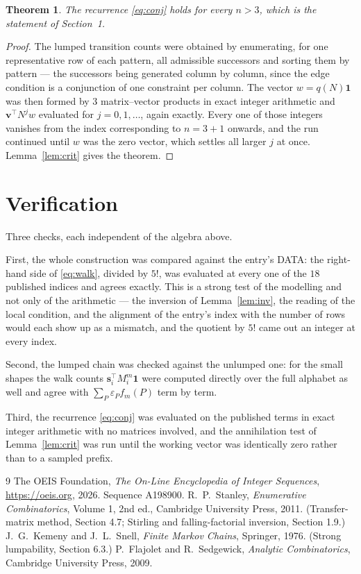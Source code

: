 \documentclass[11pt,a4paper]{article}
\theoremstyle{plain}
\newtheorem{theorem}{Theorem}
\theoremstyle{definition}
\begin{document}
\begin{theorem}
The recurrence \eqref{eq:conj} holds for every $n>3$, which is the statement of
Section~1.
\end{theorem}

\begin{proof}
The lumped transition counts were obtained by enumerating, for one representative row of
each pattern, all admissible successors and sorting them by pattern --- the successors being
generated column by column, since the edge condition is a conjunction of one constraint per
column. The vector $w=q(N)\mathbf{1}$ was then formed by $3$ matrix--vector products
in exact integer arithmetic and $\mathbf{v}^{\!\top}N^{j}w$ evaluated for
$j=0,1,\dots$, again exactly. Every one of those integers vanishes from the index
corresponding to $n=3+1$ onwards, and the run continued until $w$ was the zero vector,
which settles all larger $j$ at once. Lemma~\ref{lem:crit} gives the theorem.
\end{proof}

\section{Verification}

Three checks, each independent of the algebra above.

First, the whole construction was compared against the entry's DATA: the right-hand side of
\eqref{eq:walk}, divided by $5!$, was evaluated at every one of the $18$
published indices and agrees exactly. This is a strong test of the modelling and not only of
the arithmetic --- the inversion of Lemma~\ref{lem:inv}, the reading of the local
condition, and the alignment of the entry's index with the number of rows would each
show up as a mismatch, and the quotient by $5!$ came out an integer at every index.

Second, the lumped chain was checked against the unlumped one: for the small shapes the walk
counts $\mathbf{s}_i^{\!\top}M_i^{m}\mathbf{1}$ were computed directly over the full
alphabet as well and agree with $\sum_P\varepsilon_Pf_m(P)$ term by term.

Third, the recurrence \eqref{eq:conj} was evaluated on the published terms in exact integer
arithmetic with no matrices involved, and the annihilation test of Lemma~\ref{lem:crit} was
run until the working vector was identically zero rather than to a sampled prefix.

\begin{thebibliography}{9}
 The OEIS Foundation, \emph{The On-Line Encyclopedia of Integer
Sequences}, \url{https://oeis.org}, 2026. Sequence A198900.
 R.~P.~Stanley, \emph{Enumerative Combinatorics}, Volume 1, 2nd ed.,
Cambridge University Press, 2011. (Transfer-matrix method, Section 4.7; Stirling and
falling-factorial inversion, Section 1.9.)
 J.~G.~Kemeny and J.~L.~Snell, \emph{Finite Markov Chains}, Springer,
1976. (Strong lumpability, Section 6.3.)
 P.~Flajolet and R.~Sedgewick, \emph{Analytic Combinatorics}, Cambridge
University Press, 2009.
\end{thebibliography}
\end{document}
